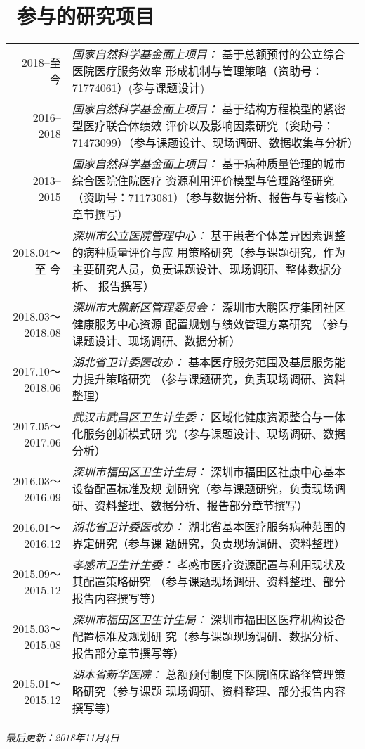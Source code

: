 \documentclass{resume}
\begin{document}
\section{\faPuzzlePiece\ 参与的研究项目}
\begin{longtable}{r p{13.3cm}}
2018--至今 & \textit{国家自然科学基金面上项目：} 基于总额预付的公立综合医院医疗服务效率 形成机制与管理策略（资助号：71774061）(参与课题设计)\\
2016--2018 & \textit{国家自然科学基金面上项目：} 基于结构方程模型的紧密型医疗联合体绩效 评价以及影响因素研究（资助号：71473099）（参与课题设计、现场调研、数据收集与分析）\\
2013--2015 & \textit{国家自然科学基金面上项目：} 基于病种质量管理的城市综合医院住院医疗 资源利用评价模型与管理路径研究（资助号：71173081）（参与数据分析、报告与专著核心章节撰写）\\
2018.04～至 今 & \textit{深圳市公立医院管理中心：} 基于患者个体差异因素调整的病种质量评价与应 用策略研究（参与课题研究，作为主要研究人员，负责课题设计、现场调研、整体数据分析、 报告撰写）\\
2018.03～2018.08 & \textit{深圳市大鹏新区管理委员会：} 深圳市大鹏医疗集团社区健康服务中心资源 配置规划与绩效管理方案研究 （参与课题设计、现场调研、数据分析）\\
2017.10～2018.06 & \textit{湖北省卫计委医改办：} 基本医疗服务范围及基层服务能力提升策略研究 （参与课题研究，负责现场调研、资料整理）\\
2017.05～2017.06 & \textit{武汉市武昌区卫生计生委：} 区域化健康资源整合与一体化服务创新模式研 究（参与课题设计、现场调研、数据分析）\\
2016.03～2016.09 & \textit{深圳市福田区卫生计生局：} 深圳市福田区社康中心基本设备配置标准及规 划研究（参与课题研究，负责现场调研、资料整理、数据分析、报告部分章节撰写）\\
2016.01～2016.12 & \textit{湖北省卫计委医改办：} 湖北省基本医疗服务病种范围的界定研究（参与课 题研究，负责现场调研、资料整理）\\
2015.09～2015.12 & \textit{孝感市卫生计生委：} 孝感市医疗资源配置与利用现状及其配置策略研究 （参与课题现场调研、资料整理、部分报告内容撰写等）\\
2015.03～2015.08 & \textit{深圳市福田区卫生计生局：} 深圳市福田区医疗机构设备配置标准及规划研 究（参与课题现场调研、数据分析、报告部分章节撰写等）\\
2015.01～2015.12 & \textit{湖本省新华医院：} 总额预付制度下医院临床路径管理策略研究（参与课题 现场调研、资料整理、部分报告内容撰写等）\\
\end{longtable}


\center \textit{最后更新：2018年11月4日}
\end{document}
